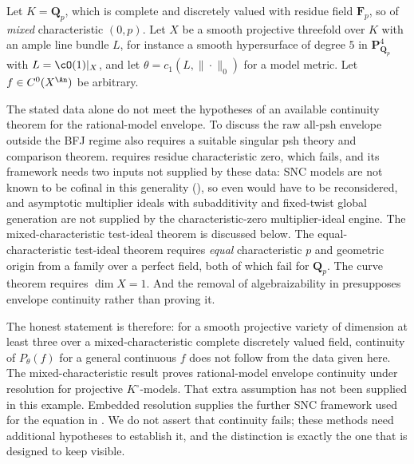 \begin{example}
\label{ex:ch23-outside-scope}
Let $K=\mathbf Q_p$, which is complete and discretely valued with residue
field $\mathbf F_p$, so of \emph{mixed} characteristic $(0,p)$.  Let
$X$ be a smooth projective threefold over $K$ with an ample line bundle
$L$, for instance a smooth hypersurface of degree $5$ in
$\mathbf P^4_{\mathbf Q_p}$ with $L=\cO(1)|_X$, and let
$\theta=c_1(L,\|\cdot\|_0)$ for a model metric.  Let $f\in C^0(X^{\An})$
be arbitrary.

The stated data alone do not meet the hypotheses of an available
continuity theorem for the rational-model envelope.  To discuss the raw
all-psh envelope outside the BFJ regime also requires a suitable singular
psh theory and comparison theorem.
 requires residue characteristic zero,
which fails, and its framework needs two inputs not supplied by these data: SNC models
are not known to be cofinal in this generality
(), so even
 would have to be reconsidered, and asymptotic
multiplier ideals with subadditivity and fixed-twist global generation are not supplied by the characteristic-zero multiplier-ideal engine.
The mixed-characteristic test-ideal theorem is discussed below.  The equal-
characteristic test-ideal theorem
 requires \emph{equal}
characteristic $p$ and geometric origin from a family over a perfect
field, both of which fail for $\mathbf Q_p$.  The curve theorem
 requires $\dim X=1$.  And the
removal of algebraizability in
 presupposes envelope continuity
rather than proving it.

The honest statement is therefore: for a smooth projective variety of
dimension at least three over a mixed-characteristic complete discretely
valued field, continuity of $P_\theta(f)$ for a general continuous $f$
does not follow from the data given here.  The mixed-characteristic
result \cite[Theorems~1.1 and~7.1]{FGK25} proves rational-model
envelope continuity under resolution for projective $K^\circ$-models.
That extra assumption has not been supplied in this example.  Embedded
resolution supplies the further SNC framework used for the equation in
.
We do not assert that continuity fails; these methods need additional
hypotheses to establish it, and the distinction is exactly the one that
 is designed to keep visible.
\end{example}

